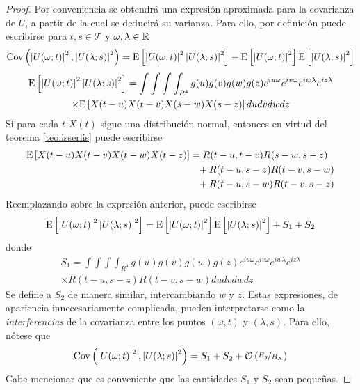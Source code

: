 \begin{proof}
Por conveniencia se obtendrá una expresión aproximada para la covarianza de $U$, a partir de la cual se deducirá su varianza. 
%
Para ello, por definición puede escribirse para $t,s \in \mathcal{T}$ y $\omega, \lambda \in \mathbb{R}$
\begin{align*}
\mathrm{Cov}\left( \left| U(\omega;t) \right|^{2},\left| U(\lambda;s) \right|^{2} \right) =
\mathrm{E}\left[ \left| U(\omega;t) \right|^{2} \left| U(\lambda;s) \right|^{2} \right] - 
\mathrm{E}\left[ \left| U(\omega;t) \right|^{2} \right] \mathrm{E}\left[ \left| U(\lambda;s) \right|^{2} \right]
\end{align*}
\begin{multline}
\mathrm{E}\left[ \left| U(\omega;t) \right|^{2} \left| U(\lambda;s) \right|^{2} \right]
=
\int \int \int \int_{R^{4}} g(u) g(v) g(w) g(z) e^{i u \omega} e^{i v \omega} e^{i w \lambda} e^{i z \lambda} \\
 \times
\mathrm{E}\left[ {X(t-u)} {X(t-v)} {X(s-w)} {X(s-z)} \right]
du dv dw dz 
\end{multline}
Si para cada $t$ $X(t)$ sigue una distribución normal, entonces en virtud del teorema \ref{teo:isserlis} puede escribirse
\begin{align*}
\E{X(t-u) {X(t-v)} {X(t-w)} X(t-z)} 
&=       R(t-u,t-v)R(s-w,s-z) \\
&\pheq + R(t-u,s-z)R(t-v,s-w) \\
&\pheq + R(t-u,s-w)R(t-v,s-z)
\end{align*}
Reemplazando sobre la expresión anterior, puede escribirse
\begin{equation}
\mathrm{E}\left[ \left| U(\omega;t) \right|^{2} \left| U(\lambda;s) \right|^{2} \right] = \mathrm{E}\left[ \left| U(\omega;t) \right|^{2} \right] \mathrm{E}\left[ \left| U(\lambda;s) \right|^{2} \right]+ S_1 + S_2
\end{equation}
donde
\begin{multline*}
S_1 = \int \int \int \int_{R^{4}} g(u) g(v) g(w) g(z) e^{i u \omega} e^{i v \omega} e^{i w \lambda} e^{i z \lambda} \\
\times
R(t-u,s-z)R(t-v,s-w)
du dv dw dz 
\end{multline*}
Se define a $S_2$ de manera similar, intercambiando $w$ y $z$. 
%
Estas expresiones, de apariencia innecesariamente complicada, pueden interpretarse como la \textit{interferencias} de la covarianza entre los puntos $(\omega, t)$ y $(\lambda,s)$.
%
Para ello, nótese que
\begin{equation}
\mathrm{Cov}\left( \left| U(\omega;t) \right|^{2},\left| U(\lambda;s) \right|^{2} \right) = S_1 + S_2 + \mathcal{O}\left( \nicefrac{B_g}{B_X} \right)
\end{equation}
%
Cabe mencionar que es conveniente que las cantidades $S_1$ y $S_2$ sean pequeñas.


\end{proof}
